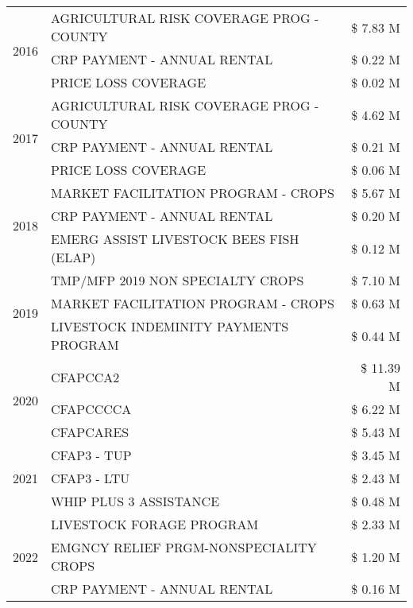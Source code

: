 \begin{tabular}{llr}
\cline{1-3}
\multirow[t]{3}{*}{2016} & AGRICULTURAL RISK COVERAGE PROG - COUNTY & \$ 7.83 M \\
 & CRP PAYMENT - ANNUAL RENTAL & \$ 0.22 M \\
 & PRICE LOSS COVERAGE & \$ 0.02 M \\
\cline{1-3}
\multirow[t]{3}{*}{2017} & AGRICULTURAL RISK COVERAGE PROG - COUNTY & \$ 4.62 M \\
 & CRP PAYMENT - ANNUAL RENTAL & \$ 0.21 M \\
 & PRICE LOSS COVERAGE & \$ 0.06 M \\
\cline{1-3}
\multirow[t]{3}{*}{2018} & MARKET FACILITATION PROGRAM - CROPS & \$ 5.67 M \\
 & CRP PAYMENT - ANNUAL RENTAL & \$ 0.20 M \\
 & EMERG ASSIST LIVESTOCK BEES FISH (ELAP) & \$ 0.12 M \\
\cline{1-3}
\multirow[t]{3}{*}{2019} & TMP/MFP 2019 NON SPECIALTY CROPS & \$ 7.10 M \\
 & MARKET FACILITATION PROGRAM - CROPS & \$ 0.63 M \\
 & LIVESTOCK INDEMINITY PAYMENTS PROGRAM & \$ 0.44 M \\
\cline{1-3}
\multirow[t]{3}{*}{2020} & CFAPCCA2 & \$ 11.39 M \\
 & CFAPCCCCA & \$ 6.22 M \\
 & CFAPCARES & \$ 5.43 M \\
\cline{1-3}
\multirow[t]{3}{*}{2021} & CFAP3 - TUP & \$ 3.45 M \\
 & CFAP3 - LTU & \$ 2.43 M \\
 & WHIP PLUS 3 ASSISTANCE & \$ 0.48 M \\
\cline{1-3}
\multirow[t]{3}{*}{2022} & LIVESTOCK FORAGE PROGRAM & \$ 2.33 M \\
 & EMGNCY RELIEF PRGM-NONSPECIALITY CROPS & \$ 1.20 M \\
 & CRP PAYMENT - ANNUAL RENTAL & \$ 0.16 M \\
\cline{1-3}
\bottomrule
\end{tabular}
